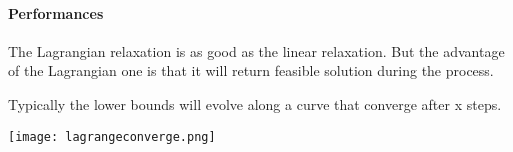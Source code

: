 \paragraph{Performances}

The Lagrangian relaxation is as good as the linear relaxation. But the
advantage of the Lagrangian one is that it will return feasible solution
during the process.

Typically the lower bounds will evolve along a curve that converge after x steps.

\centerline{\texttt{[image: lagrangeconverge.png]}}

